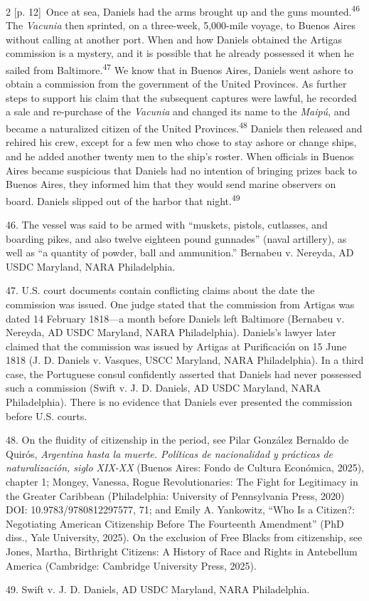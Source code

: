 \documentclass[10pt,a4paper]{article}
\begin{document}
\begin{paracol}{2}
\switchcolumn
{\scriptsize\color{gray} [p. 12]}\ Once at sea, Daniels had the arms brought up and the guns mounted.\nobreak\textsuperscript{46} The \textit{Vacunia} then sprinted, on a three-week, 5,000-mile voyage, to Buenos Aires without calling at another port. When and how Daniels obtained the Artigas commission is a mystery, and it is possible that he already possessed it when he sailed from Baltimore.\nobreak\textsuperscript{47} We know that in Buenos Aires, Daniels went ashore to obtain a commission from the government of the United Provinces. As further steps to support his claim that the subsequent captures were lawful, he recorded a sale and re-purchase of the \textit{Vacunia} and changed its name to the \textit{Maipú}, and became a naturalized citizen of the United Provinces.\nobreak\textsuperscript{48} Daniels then released and rehired his crew, except for a few men who chose to stay ashore or change ships, and he added another twenty men to the ship’s roster. When officials in Buenos Aires became suspicious that Daniels had no intention of bringing prizes back to Buenos Aires, they informed him that they would send marine observers on board. Daniels slipped out of the harbor that night.\nobreak\textsuperscript{49}\par{\small 46. The vessel was said to be armed with “muskets, pistols, cutlasses, and boarding pikes, and also twelve eighteen pound gunnades” (naval artillery), as well as “a quantity of powder, ball and ammunition.” Bernabeu v. Nereyda, AD USDC Maryland, NARA Philadelphia.\par}{\small 47. U.S. court documents contain conflicting claims about the date the commission was issued. One judge stated that the commission from Artigas was dated 14 February 1818—a month before Daniels left Baltimore (Bernabeu v. Nereyda, AD USDC Maryland, NARA Philadelphia). Daniels’s lawyer later claimed that the commission was issued by Artigas at Purificación on 15 June 1818 (J. D. Daniels v. Vasques, USCC Maryland, NARA Philadelphia). In a third case, the Portuguese consul confidently asserted that Daniels had never possessed such a commission (Swift v. J. D. Daniels, AD USDC Maryland, NARA Philadelphia). There is no evidence that Daniels ever presented the commission before U.S. courts.\par}{\small 48. On the fluidity of citizenship in the period, see Pilar González Bernaldo de Quirós, \textit{Argentina hasta la muerte. Políticas de nacionalidad y prácticas de naturalización, siglo XIX-XX} (Buenos Aires: Fondo de Cultura Económica, 2025), chapter 1; Mongey, Vanessa, Rogue Revolutionaries: The Fight for Legitimacy in the Greater Caribbean (Philadelphia: University of Pennsylvania Press, 2020) DOI: 10.9783/9780812297577, 71; and Emily A. Yankowitz, “Who Is a Citizen?: Negotiating American Citizenship Before The Fourteenth Amendment” (PhD diss., Yale University, 2025). On the exclusion of Free Blacks from citizenship, see Jones, Martha, Birthright Citizens: A History of Race and Rights in Antebellum America (Cambridge: Cambridge University Press, 2025).\par}{\small 49. Swift v. J. D. Daniels, AD USDC Maryland, NARA Philadelphia.\par}

\end{paracol}
\end{document}
